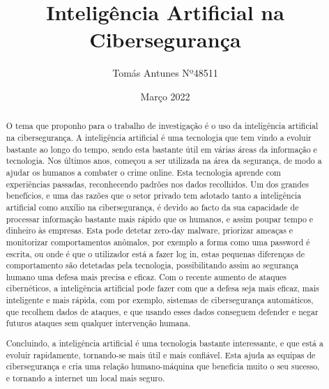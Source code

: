 \documentclass{article}
\title{Inteligência Artificial na Cibersegurança}
\author{Tomás Antunes Nº48511}
\date{Março 2022}
\begin{document}
\maketitle
\begin{abstract}

O tema que proponho para o trabalho de investigação é o uso da inteligência artificial na cibersegurança. A inteligência artificial é uma tecnologia que tem vindo a evoluir bastante ao longo do tempo, sendo esta bastante útil em várias áreas da informação e tecnologia. Nos últimos anos, começou a ser utilizada na área da segurança, de modo a ajudar os humanos a combater o crime online. Esta tecnologia aprende com experiências passadas, reconhecendo padrões nos dados recolhidos. Um dos grandes benefícios, e uma das razões que o setor privado tem adotado tanto a inteligência artificial como auxílio na cibersegurança, é devido ao facto da sua capacidade de processar informação bastante mais rápido que os humanos, e assim poupar tempo e dinheiro às empresas. Esta pode detetar zero-day malware, priorizar ameaças e monitorizar comportamentos anômalos, por exemplo a forma como uma password é escrita, ou onde é que o utilizador está a fazer log in, estas pequenas diferenças de comportamento são detetadas pela tecnologia, possibilitando assim ao segurança humano uma defesa mais precisa e eficaz. Com o recente aumento de ataques cibernéticos, a inteligência artificial pode fazer com que a defesa seja mais eficaz, mais inteligente e mais rápida, com por exemplo, sistemas de cibersegurança automáticos, que recolhem dados de ataques, e que usando esses dados conseguem defender e negar futuros ataques sem qualquer intervenção humana. 

Concluindo, a inteligência artificial é uma tecnologia bastante interessante, e que está a evoluir rapidamente, tornando-se mais útil e mais confiável. Esta ajuda as equipas de cibersegurança e cria uma relação humano-máquina que beneficia muito o seu sucesso, e tornando a internet um local mais seguro.



\end{abstract}

\cite{kuzlu2021role}
\cite{laato2020ai}
\cite{sarker2021ai}
\cite{lazic2019benefit}
\cite{stevens2020knowledge}







\end{document}
